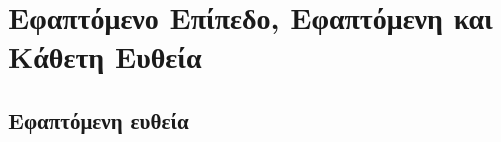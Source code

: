 




\usepackage{wrapfig}


\pagestyle{vangelis}
\everymath{\displaystyle}
\setcounter{chapter}{1}





\chapter*{Εφαπτόμενο Επίπεδο, Εφαπτόμενη και Κάθετη Ευθεία}

\section*{Εφαπτόμενη ευθεία}


